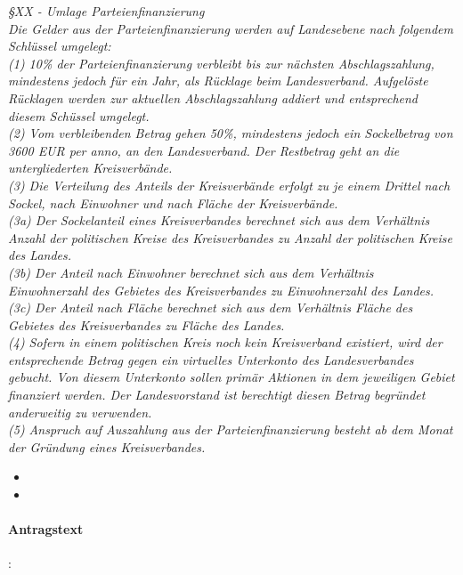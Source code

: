 \textit{§XX - Umlage Parteienfinanzierung\\
Die Gelder aus der Parteienfinanzierung werden auf Landesebene nach folgendem Schlüssel umgelegt:\\
(1) 10\% der Parteienfinanzierung verbleibt bis zur nächsten Abschlagszahlung, mindestens jedoch für ein Jahr, als Rücklage beim Landesverband. Aufgelöste Rücklagen werden zur aktuellen Abschlagszahlung addiert und entsprechend diesem Schüssel umgelegt.\\
(2) Vom verbleibenden Betrag gehen 50\%, mindestens jedoch ein Sockelbetrag von 3600 EUR per anno, an den Landesverband. Der Restbetrag geht an die untergliederten Kreisverbände.\\
(3) Die Verteilung des Anteils der Kreisverbände erfolgt zu je einem Drittel nach Sockel, nach Einwohner und nach Fläche der Kreisverbände.\\
(3a) Der Sockelanteil eines Kreisverbandes berechnet sich aus dem Verhältnis Anzahl der politischen Kreise des Kreisverbandes zu Anzahl der politischen Kreise des Landes.\\
(3b) Der Anteil nach Einwohner berechnet sich aus dem Verhältnis Einwohnerzahl des Gebietes des Kreisverbandes zu Einwohnerzahl des Landes.\\
(3c) Der Anteil nach Fläche berechnet sich aus dem Verhältnis Fläche des Gebietes des Kreisverbandes zu Fläche des Landes.\\
(4) Sofern in einem politischen Kreis noch kein Kreisverband existiert, wird der entsprechende Betrag gegen ein virtuelles Unterkonto des Landesverbandes gebucht. Von diesem Unterkonto sollen primär Aktionen in dem jeweiligen Gebiet finanziert werden. Der Landesvorstand ist berechtigt diesen Betrag begründet anderweitig zu verwenden.\\
(5) Anspruch auf Auszahlung aus der Parteienfinanzierung besteht ab dem Monat der Gründung eines Kreisverbandes.}


\label{satzung:partfin2}
\begin{itemize}
\item {}
\item {}
\end{itemize}

\paragraph{Antragstext}:

